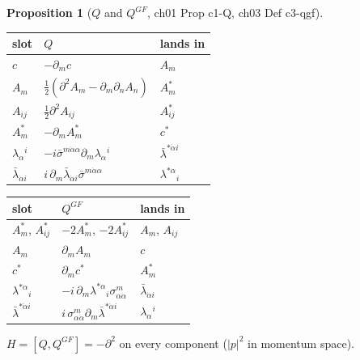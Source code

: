 \documentclass[11pt]{article}
\theoremstyle{definition}
\newtheorem{proposition}[definition]{Proposition}
\begin{document}
\begin{proposition}[$Q$ and $Q^{GF}$, ch01 Prop c1-Q, ch03 Def c3-qgf]\label{prop:Q}\ 
\begin{center}\small
\begin{tabular}{l|l|l}
slot & $Q$ & lands in \\
\hline
$c$ & $-\partial_mc$ & $A_m$ \\
$A_m$ & $\tfrac12(\partial^2A_m-\partial_m\partial_nA_n)$ & $A^*_m$ \\
$A_{ij}$ & $\tfrac12\partial^2A_{ij}$ & $A^*_{ij}$ \\
$A^*_m$ & $-\partial_mA^*_m$ & $c^*$ \\
$\lambda_\alpha{}^i$ & $-i\bar\sigma^{m\dot\alpha\alpha}\partial_m\lambda_\alpha{}^i$ & $\bar\lambda^{*\dot\alpha i}$ \\
$\bar\lambda_{\dot\alpha i}$ & $i\,\partial_m\bar\lambda_{\dot\alpha i}\bar\sigma^{m\dot\alpha\alpha}$ & $\lambda^{*\alpha}{}_i$ \\
\end{tabular}
\qquad
\begin{tabular}{l|l|l}
slot & $Q^{GF}$ & lands in \\
\hline
$A^*_m$, $A^*_{ij}$ & $-2A^*_m$, $-2A^*_{ij}$ & $A_m$, $A_{ij}$ \\
$A_m$ & $\partial_mA_m$ & $c$ \\
$c^*$ & $\partial_mc^*$ & $A^*_m$ \\
$\lambda^{*\alpha}{}_i$ & $-i\,\partial_m\lambda^{*\alpha}{}_i\sigma^m_{\alpha\dot\alpha}$ & $\bar\lambda_{\dot\alpha i}$ \\
$\bar\lambda^{*\dot\alpha i}$ & $i\,\sigma^m_{\alpha\dot\alpha}\partial_m\bar\lambda^{*\dot\alpha i}$ & $\lambda_\alpha{}^i$ \\
\end{tabular}
\end{center}

$H=[Q,Q^{GF}]=-\partial^2$ on every component ($|p|^2$ in momentum space).
\end{proposition}
\end{document}
